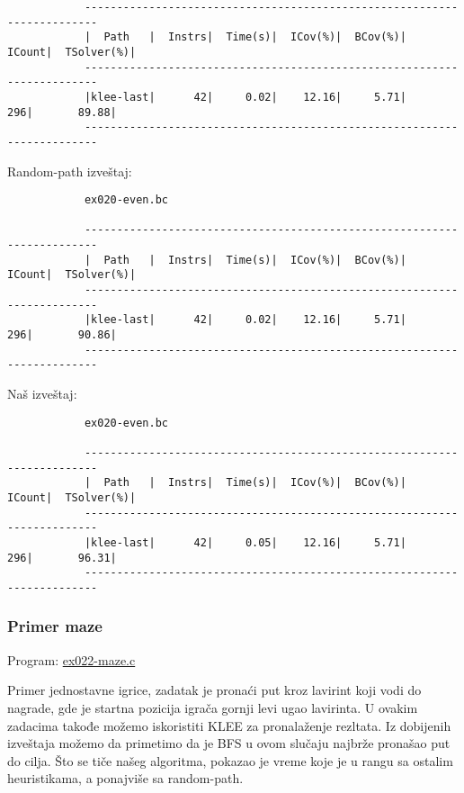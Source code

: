 \documentclass[a4paper]{article}
\begin{document}
{\begin{verbatim}
			------------------------------------------------------------------------
			|  Path   |  Instrs|  Time(s)|  ICov(%)|  BCov(%)|  ICount|  TSolver(%)|
			------------------------------------------------------------------------
			|klee-last|      42|     0.02|    12.16|     5.71|     296|       89.88|
			------------------------------------------------------------------------
		\end{verbatim}
		
		
		Random-path izveštaj:
		
		\begin{verbatim}
			ex020-even.bc
			
			------------------------------------------------------------------------
			|  Path   |  Instrs|  Time(s)|  ICov(%)|  BCov(%)|  ICount|  TSolver(%)|
			------------------------------------------------------------------------
			|klee-last|      42|     0.02|    12.16|     5.71|     296|       90.86|
			------------------------------------------------------------------------
		\end{verbatim}
		
		Naš izveštaj:
		
		\begin{verbatim}
			ex020-even.bc
			
			------------------------------------------------------------------------
			|  Path   |  Instrs|  Time(s)|  ICov(%)|  BCov(%)|  ICount|  TSolver(%)|
			------------------------------------------------------------------------
			|klee-last|      42|     0.05|    12.16|     5.71|     296|       96.31|
			------------------------------------------------------------------------
		\end{verbatim}
		
	\subsubsection{Primer maze}
 	
		Program: \href{file:primeri/ex022-maze.c}{ex022-maze.c}
		
		Primer jednostavne igrice, zadatak je pronaći put kroz lavirint koji vodi do nagrade, gde je startna pozicija igrača gornji levi ugao lavirinta. U ovakim zadacima takođe možemo iskoristiti KLEE za pronalaženje rezltata. Iz dobijenih izveštaja možemo da primetimo da je BFS u ovom slučaju najbrže pronašao put do cilja. Što se tiče našeg algoritma, pokazao je vreme koje je u rangu sa ostalim heuristikama, a ponajviše sa random-path.
		
}
\end{document}
